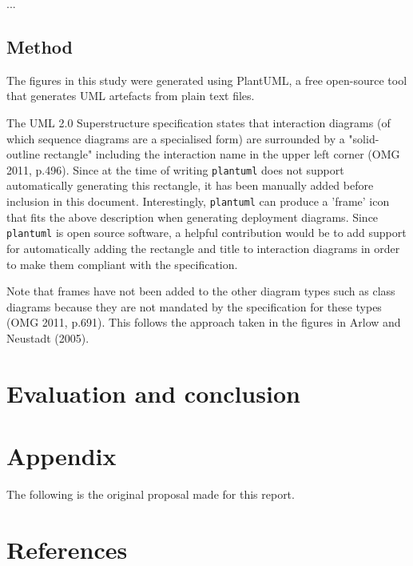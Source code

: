 \documentclass{article}
\begin{document}
...

\subsection{Method}

The figures in this study were generated using PlantUML, a free open-source tool\cite{plantuml} that generates UML artefacts from plain text files.

The UML 2.0 Superstructure specification states that interaction diagrams (of which sequence diagrams are a specialised form) are surrounded by a "solid-outline rectangle" including the interaction name in the upper left corner (OMG 2011, p.496). Since at the time of writing \texttt{plantuml} does not support automatically generating this rectangle, it has been manually added before inclusion in this document. Interestingly, \texttt{plantuml} can produce a 'frame' icon that fits the above description when generating deployment diagrams. Since \texttt{plantuml} is open source software, a helpful contribution would be to add support for automatically adding the rectangle and title to interaction diagrams in order to make them compliant with the specification. 

Note that frames have not been added to the other diagram types such as class diagrams because they are not mandated by the specification for these types (OMG 2011, p.691). This follows the approach taken in the figures in Arlow and Neustadt (2005).

\section{Evaluation and conclusion}



\section{Appendix}

The following is the original proposal made for this report.

\section{References}
\end{document}
